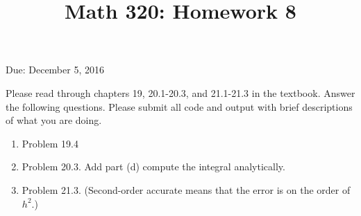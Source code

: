 \documentclass[12pt]{amsart}
\begin{document}
\title{Math 320: Homework 8}
Due: December 5, 2016
\maketitle

Please read through chapters 19, 20.1-20.3, and 21.1-21.3 in the textbook.
Answer the following questions. Please submit all code
and output with brief descriptions of what you are doing.

\vspace{5mm}

\begin{enumerate}

\item Problem 19.4

\item Problem 20.3. Add part (d) compute the integral analytically.

\item Problem 21.3. (Second-order accurate means that the error is on the
order of $h^2$.)

\end{enumerate}
\end{document}
